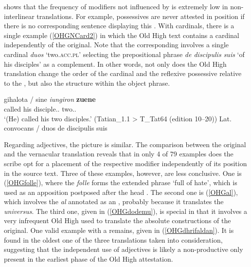 \documentclass[output=paper,colorlinks,citecolor=brown,draft]{langscibook}
\begin{document}
 shows that the frequency of  modifiers not influenced by  is extremely low in non-interlinear translations. For example, possessives are never attested in  position if there is no corresponding  sentence displaying this . With cardinals, there is a single example (\ref{OHGNCard2}) in which the Old High  text contains a  cardinal  independently of the  original. Note that the corresponding   involves a single cardinal \textit{duos} ‘two.\textsc{acc.pl}’ selecting the prepositional phrase \textit{de discipulis suis} ‘of his disciples’ as a complement. In other words, not only does the Old High  translation change the order of the cardinal and the reflexive possessive relative to the , but also the structure within the object phrase. 

\ea\label{OHGNCard2}
\gll gihalota / sine \textit{iungiron} \textbf{zuene}\\
called {}  his disciple.\ACC.\PL{} two.\ACC.\PL{}\\
\glt ‘(He) called his two disciples.’ (Tatian\_1.1 > T\_Tat64 (edition 10--20))
\glt Lat. convocans / duos de discipulis suis 
\z

Regarding adjectives, the picture is similar. The comparison between the  original and the vernacular translation reveals that in only 4 of 79 examples does the scribe opt for a  placement of the respective modifier independently of its position in the source text. Three of these examples, however, are less conclusive. One is (\ref{OHGfolle}), where the  \textit{folle} forms the extended phrase ‘full of hate’, which is used as an apposition postposed after the head . The second one is (\ref{OHGal}), which involves the  \textit{al} annotated as an , probably because it translates the    \textit{universus}. The third one, given in (\ref{OHGdodemu}), is special in that it involves a very infrequent Old High   used to translate the absolute constructions of the  original. One valid example with a   remains, given in (\ref{OHGdhrifaldan}). It is found in the oldest one of the three translations taken into consideration, suggesting that the independent  use of adjectives is likely a non-productive  only present in the earliest phase of the Old High  attestation.
\end{document}
